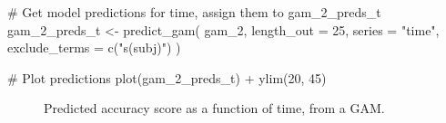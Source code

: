 \documentclass[
  letterpaper,
  DIV=11,
  numbers=noendperiod]{scrartcl}
\newenvironment{Shaded}{\begin{snugshade}}{\end{snugshade}}
\newcommand{\AttributeTok}[1]{\textcolor[rgb]{0.40,0.45,0.13}{#1}}
\newcommand{\CommentTok}[1]{\textcolor[rgb]{0.37,0.37,0.37}{#1}}
\newcommand{\DecValTok}[1]{\textcolor[rgb]{0.68,0.00,0.00}{#1}}
\newcommand{\FunctionTok}[1]{\textcolor[rgb]{0.28,0.35,0.67}{#1}}
\newcommand{\NormalTok}[1]{\textcolor[rgb]{0.00,0.23,0.31}{#1}}
\newcommand{\OtherTok}[1]{\textcolor[rgb]{0.00,0.23,0.31}{#1}}
\newcommand{\SpecialCharTok}[1]{\textcolor[rgb]{0.37,0.37,0.37}{#1}}
\newcommand{\StringTok}[1]{\textcolor[rgb]{0.13,0.47,0.30}{#1}}
\begin{document}
\begin{Shaded}
\begin{Highlighting}[]
\CommentTok{\# Get model predictions for \textquotesingle{}time\textquotesingle{}, assign them to \textquotesingle{}gam\_2\_preds\_t\textquotesingle{}}
\NormalTok{gam\_2\_preds\_t }\OtherTok{\textless{}{-}} \FunctionTok{predict\_gam}\NormalTok{(}
\NormalTok{  gam\_2, }\AttributeTok{length\_out =} \DecValTok{25}\NormalTok{,}
  \AttributeTok{series =} \StringTok{"time"}\NormalTok{,}
  \AttributeTok{exclude\_terms =} \FunctionTok{c}\NormalTok{(}\StringTok{"s(subj)"}\NormalTok{)}
\NormalTok{)}
\end{Highlighting}
\end{Shaded}

\begin{Shaded}
\begin{Highlighting}[]
\CommentTok{\# Plot predictions}
\FunctionTok{plot}\NormalTok{(gam\_2\_preds\_t) }\SpecialCharTok{+}
  \FunctionTok{ylim}\NormalTok{(}\DecValTok{20}\NormalTok{, }\DecValTok{45}\NormalTok{)}
\end{Highlighting}
\end{Shaded}

\begin{figure}[H]


\caption{\label{fig-gam-2-preds-t}Predicted accuracy score as a function
of time, from a GAM.}

\end{figure}%
\end{document}
